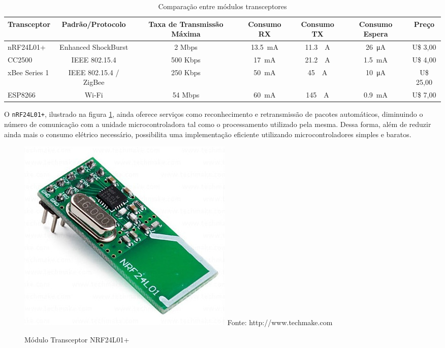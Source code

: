 \begin{table}[H]
	\centering
	\resizebox{\textwidth}{!} {
		\begin{tabular}{|l|c|c|c|c|c|c|}
		\hline
		Transceptor   & Padrão/Protocolo       & Taxa de Transmissão Máxima & Consumo RX & Consumo TX &
		Consumo Espera & Preço     \\ \hline \hline
		nRF24L01+     & Enhanced ShockBurst    & 2 Mbps   & \SI{13.5}{\milli \ampere} & \SI{11.3}{\milli
		\ampere} & \SI{26}{\micro \ampere} & U\$ 3,00  \\ \hline
		CC2500        & IEEE 802.15.4          & 500 Kbps & \SI{17}{\milli \ampere}   & \SI{21.2} {\milli
		\ampere}  & \SI{1.5}{\milli \ampere} & U\$ 4,00  \\ \hline
		xBee Series 1 & IEEE 802.15.4 / ZigBee & 250 Kbps & \SI{50}{\milli \ampere}   & \SI{45}{\milli
		\ampere} & \SI{10}{\micro \ampere}  & U\$ 25,00 \\ \hline
		ESP8266       & Wi-Fi                  & 54 Mbps  & \SI{60}{\milli \ampere}   & \SI{145}{\milli
		\ampere} & \SI{0.9}{\milli \ampere}& U\$ 7,00  \\ \hline
		\end{tabular}
	}
	\caption{Comparação entre módulos transceptores}
	\label{quadro:transceivers}
\end{table}

O \texttt{nRF24L01+}, ilustrado na figura \ref{figura:nrf}, ainda oferece serviços como reconhecimento e
retransmissão de pacotes automáticos, diminuindo o número de comunicação com a unidade microcontroladora tal
como o processamento utilizado pela mesma. Dessa forma, além de reduzir ainda mais o consumo elétrico
necessário, possibilita uma implementação eficiente utilizando microcontroladores simples e baratos.

\begin{figure}[h]
	\caption{Módulo Transceptor NRF24L01+}
	\centering
	\includegraphics[scale=0.25]{../images/nrf.jpg}
	\hspace{\linewidth}
	Fonte: http://www.techmake.com
	\label{figura:nrf}
\end{figure}


